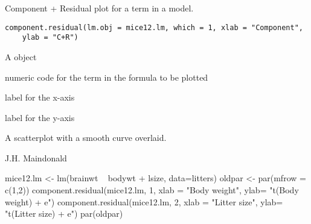 \begin{Description}\relax
Component + Residual plot for a term in a  model.
\end{Description}
\begin{Usage}
\begin{verbatim}
component.residual(lm.obj = mice12.lm, which = 1, xlab = "Component",
    ylab = "C+R")
\end{verbatim}
\end{Usage}
\begin{Arguments}
\begin{ldescription}
\item[\code{lm.obj}] A  object 
\item[\code{which}] numeric code for the term in the  formula to be 
plotted
\item[\code{xlab}] label for the x-axis
\item[\code{ylab}] label for the y-axis
\end{ldescription}
\end{Arguments}
\begin{Value}
A scatterplot with a smooth curve overlaid.
\end{Value}
\begin{Author}\relax
J.H. Maindonald
\end{Author}
\begin{SeeAlso}\relax
{}
\end{SeeAlso}
\begin{Examples}
\begin{ExampleCode}
mice12.lm <- lm(brainwt ~ bodywt + lsize, data=litters)
oldpar <- par(mfrow = c(1,2))
component.residual(mice12.lm, 1, xlab = "Body weight", ylab= "t(Body weight) + e")
component.residual(mice12.lm, 2, xlab = "Litter size", ylab= "t(Litter size) + e")
par(oldpar)
\end{ExampleCode}
\end{Examples}

